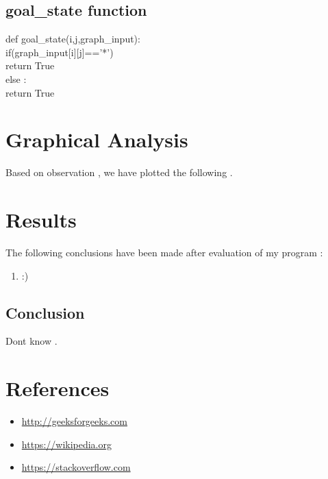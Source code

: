 \documentclass{article}
\begin{document}
\subsection*{goal\_state function}
    \vspace{5pt}
    def goal\_state(i,j,graph\_input):
    \vspace{5pt}
        \\ \hspace*{20pt}if(graph\_input[i][j]=='*')
        \vspace{5pt}
        \\ \hspace*{30pt} return True
        \vspace{2pt}
        \\ \hspace*{20pt}else :
        \vspace{5pt}
        \\ \hspace*{30pt} return True
\newpage
\section{Graphical Analysis}
\vspace{5pt}
Based on observation , we have plotted the following .
\newpage
\section{Results}
\vspace{20pt}
The following conclusions have been made after evaluation of my program : 
\begin{enumerate}
    \item :)
\end{enumerate}
\vspace{20pt}
\subsection*{Conclusion}
Dont know .
\newpage
\section{References}
\vspace{30pt}
\begin{itemize}
    \item \url{http://geeksforgeeks.com}
    \item \url{https://wikipedia.org}
    \item \url{https://stackoverflow.com}
\end{itemize}
\end{document}
